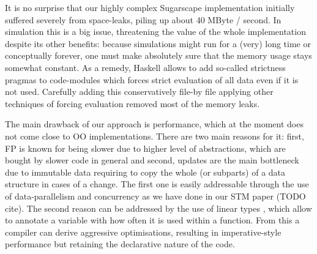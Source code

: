 It is no surprise that our highly complex Sugarscape implementation initially suffered severely from space-leaks, piling up about 40 MByte / second. In simulation this is a big issue, threatening the value of the whole implementation despite its other benefits: because simulations might run for a (very) long time or conceptually forever, one must make absolutely sure that the memory usage stays somewhat constant. As a remedy, Haskell allows to add so-called strictness pragmas to code-modules which forces strict evaluation of all data even if it is not used. Carefully adding this conservatively file-by file applying other techniques of forcing evaluation removed most of the memory leaks.


The main drawback of our approach is performance, which at the moment does not come close to OO implementations. There are two main reasons for it: first, FP is known for being slower due to higher level of abstractions, which are bought by slower code in general and second, updates are the main bottleneck due to immutable data requiring to copy the whole (or subparts) of a data structure in cases of a change. The first one is easily addressable through the use of data-parallelism and concurrency as we have done in our STM paper (TODO cite). 
The second reason can be addressed by the use of linear types \cite{bernardy_linear_2017}, which allow to annotate a variable with how often it is used within a function. From this a compiler can derive aggressive optimisations, resulting in imperative-style performance but retaining the declarative nature of the code.